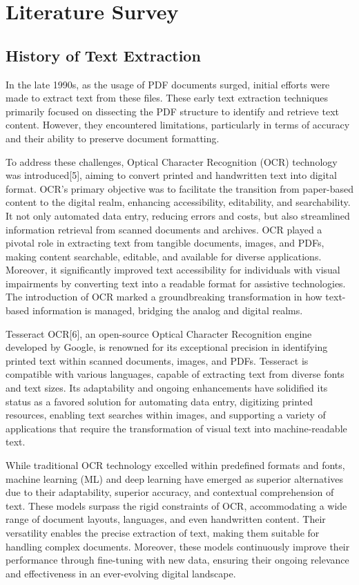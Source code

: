 \documentclass[conference]{IEEEtran}
\begin{document}
\section{Literature Survey}

\subsection{History of Text Extraction}

In the late 1990s, as the usage of PDF documents surged, initial efforts were made to extract text from these files. These early text extraction techniques primarily focused on dissecting the PDF structure to identify and retrieve text content. However, they encountered limitations, particularly in terms of accuracy and their ability to preserve document formatting. 

To address these challenges, Optical Character Recognition (OCR) technology was introduced[5], aiming to convert printed and handwritten text into digital format. OCR's primary objective was to facilitate the transition from paper-based content to the digital realm, enhancing accessibility, editability, and searchability. It not only automated data entry, reducing errors and costs, but also streamlined information retrieval from scanned documents and archives. OCR played a pivotal role in extracting text from tangible documents, images, and PDFs, making content searchable, editable, and available for diverse applications. Moreover, it significantly improved text accessibility for individuals with visual impairments by converting text into a readable format for assistive technologies. The introduction of OCR marked a groundbreaking transformation in how text-based information is managed, bridging the analog and digital realms.

Tesseract OCR[6], an open-source Optical Character Recognition engine developed by Google, is renowned for its exceptional precision in identifying printed text within scanned documents, images, and PDFs. Tesseract is compatible with various languages, capable of extracting text from diverse fonts and text sizes. Its adaptability and ongoing enhancements have solidified its status as a favored solution for automating data entry, digitizing printed resources, enabling text searches within images, and supporting a variety of applications that require the transformation of visual text into machine-readable text.

While traditional OCR technology excelled within predefined formats and fonts, machine learning (ML) and deep learning have emerged as superior alternatives due to their adaptability, superior accuracy, and contextual comprehension of text. These models surpass the rigid constraints of OCR, accommodating a wide range of document layouts, languages, and even handwritten content. Their versatility enables the precise extraction of text, making them suitable for handling complex documents. Moreover, these models continuously improve their performance through fine-tuning with new data, ensuring their ongoing relevance and effectiveness in an ever-evolving digital landscape.
\end{document}

